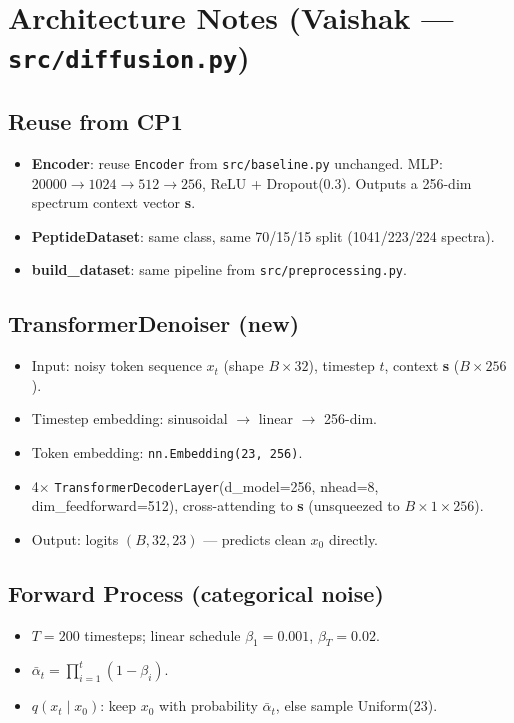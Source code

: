 \documentclass[11pt,letterpaper]{article}
\begin{document}
\section{Architecture Notes (Vaishak --- \texttt{src/diffusion.py})}

\subsection*{Reuse from CP1}
\begin{itemize}
  \item \textbf{Encoder}: reuse \texttt{Encoder} from \texttt{src/baseline.py} unchanged.
    MLP: $20000 \rightarrow 1024 \rightarrow 512 \rightarrow 256$, ReLU + Dropout(0.3).
    Outputs a 256-dim spectrum context vector \textbf{s}.
  \item \textbf{PeptideDataset}: same class, same 70/15/15 split (1041/223/224 spectra).
  \item \textbf{build\_dataset}: same pipeline from \texttt{src/preprocessing.py}.
\end{itemize}

\subsection*{TransformerDenoiser (new)}
\begin{itemize}
  \item Input: noisy token sequence $x_t$ (shape $B \times 32$), timestep $t$, context \textbf{s} ($B \times 256$).
  \item Timestep embedding: sinusoidal $\rightarrow$ linear $\rightarrow$ 256-dim.
  \item Token embedding: \texttt{nn.Embedding(23, 256)}.
  \item 4$\times$ \texttt{TransformerDecoderLayer}(d\_model=256, nhead=8, dim\_feedforward=512),
    cross-attending to \textbf{s} (unsqueezed to $B \times 1 \times 256$).
  \item Output: logits $(B, 32, 23)$ --- predicts clean $x_0$ directly.
\end{itemize}

\subsection*{Forward Process (categorical noise)}
\begin{itemize}
  \item $T = 200$ timesteps; linear schedule $\beta_1 = 0.001$, $\beta_T = 0.02$.
  \item $\bar{\alpha}_t = \prod_{i=1}^{t}(1 - \beta_i)$.
  \item $q(x_t \mid x_0)$: keep $x_0$ with probability $\bar{\alpha}_t$, else sample Uniform(23).
\end{itemize}
\end{document}
